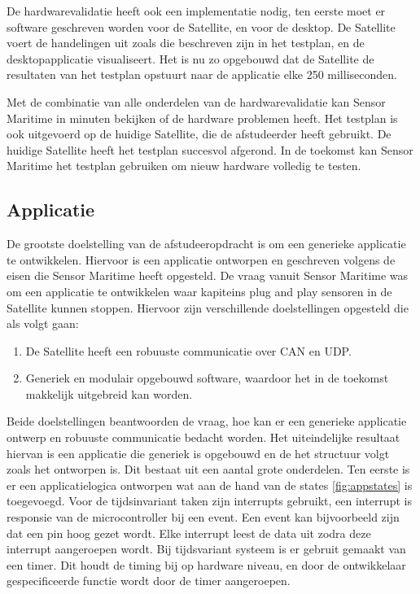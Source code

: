\noindent De hardwarevalidatie heeft ook een implementatie nodig, ten eerste moet er software geschreven worden voor de Satellite, en voor de desktop. De Satellite voert de handelingen uit zoals die beschreven zijn in het testplan, en de desktopapplicatie visualiseert. Het is nu zo opgebouwd dat de Satellite de resultaten van het testplan opstuurt naar de applicatie elke 250 milliseconden. \newline

\noindent Met de combinatie van alle onderdelen van de hardwarevalidatie kan Sensor Maritime in minuten bekijken of de hardware problemen heeft. Het testplan is ook uitgevoerd op de huidige Satellite, die de afstudeerder heeft gebruikt. De huidige Satellite heeft het testplan succesvol afgerond. In de toekomst kan Sensor Maritime het testplan gebruiken om nieuw hardware volledig te testen. 

\subsection{Applicatie}
De grootste doelstelling van de afstudeeropdracht is om een generieke applicatie te ontwikkelen. Hiervoor is een applicatie ontworpen en geschreven volgens de eisen die Sensor Maritime heeft opgesteld. De vraag vanuit Sensor Maritime was om een applicatie te ontwikkelen waar kapiteins plug and play sensoren in de Satellite kunnen stoppen. Hiervoor zijn verschillende doelstellingen opgesteld die als volgt gaan:
\begin{enumerate}
	\item De Satellite heeft een robuuste communicatie over CAN en UDP.
	\item Generiek en modulair opgebouwd software, waardoor het in de toekomst makkelijk uitgebreid kan worden.
\end{enumerate}

\noindent Beide doelstellingen beantwoorden de vraag, hoe kan er een generieke applicatie ontwerp en robuuste communicatie bedacht worden. Het uiteindelijke resultaat hiervan is een applicatie die generiek is opgebouwd en de het structuur volgt zoals het ontworpen is. Dit bestaat uit een aantal grote onderdelen. Ten eerste is er een applicatielogica ontworpen wat aan de hand van de states \ref{fig:appstates} is toegevoegd. Voor de tijdsinvariant taken zijn interrupts gebruikt, een interrupt is responsie van de microcontroller bij een event. Een event kan bijvoorbeeld zijn dat een pin hoog gezet wordt. Elke interrupt leest de data uit zodra deze interrupt aangeroepen wordt. Bij tijdsvariant systeem is er gebruit gemaakt van een timer. Dit houdt de timing bij op hardware niveau, en door de ontwikkelaar gespecificeerde functie wordt door de timer aangeroepen. \newline

